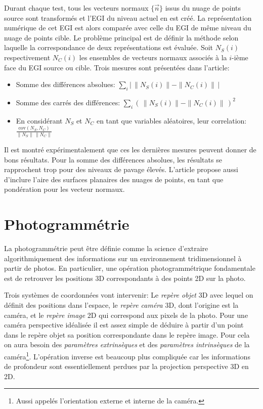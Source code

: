 \documentclass[a4paper,10pt]{scrreprt}
\begin{document}
Durant chaque test, tous les vecteurs normaux $\{ \vec{n} \}$ issus du nuage de points source sont transformés et l'EGI du niveau actuel en est créé. La représentation numérique de cet EGI est alors comparée avec celle du EGI de même niveau du nuage de points cible. Le problème principal est de définir la méthode selon laquelle la correspondance de deux représentations est évaluée. Soit $N_S(i)$ respectivement $N_C(i)$ les ensembles de vecteurs normaux associés à la $i$-ième face du EGI source ou cible. Trois mesures sont présentées dans l'article:
\begin{itemize}
	\item Somme des différences absolues: $\sum_{i} \left| \, \|N_S(i)\| - \|N_C(i)\| \, \right|$
	\item Somme des carrés des différences: $\sum_{i} \left( \, \|N_S(i)\| - \|N_C(i)\| \, \right)^2$
	\item En considérant $N_S$ et $N_C$ en tant que variables aléatoires, leur correlation: $\frac{\text{cov}(N_S, N_C)}{\|N_S\| \, \|N_C\|}$
\end{itemize}
Il est montré expérimentalement que ces les dernières mesures peuvent donner de bons résultats. Pour la somme des différences absolues, les résultats se rapprochent trop pour des niveaux de pavage élevés. L'article propose aussi d'inclure l'aire des surfaces planaires des nuages de points, en tant que pondération pour les vecteur normaux.



\section{Photogrammétrie} \label{sec:photogrammetry}
La photogrammétrie peut être définie comme la science d'extraire algorithmiquement des informations sur un environnement tridimensionnel à partir de photos. En particulier, une opération photogrammétrique fondamentale est de retrouver les positions 3D correspondants à des points 2D sur la photo.

Trois systèmes de coordonnées vont intervenir: Le \emph{repère objet} 3D avec lequel on définit des positions dans l'espace, le \emph{repère caméra} 3D, dont l'origine est la caméra, et le \emph{repère image} 2D qui correspond aux pixels de la photo. Pour une caméra perspective idéalisée il est assez simple de déduire à partir d'un point dans le repère objet sa position correspondante dans le repère image. Pour cela on aura besoin des \emph{paramètres extrinsèques} et des \emph{paramètres intrinsèques} de la caméra\footnote{Aussi appelés l'orientation externe et interne de la caméra.}. L'opération inverse est beaucoup plus compliquée car les informations de profondeur sont essentiellement perdues par la projection perspective 3D en 2D.
\end{document}
